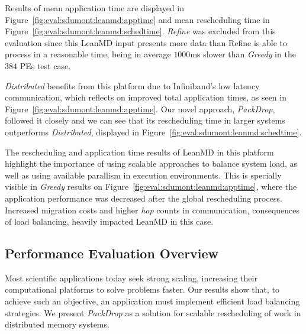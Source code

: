 

Results of mean application time are displayed in Figure~\ref{fig:eval:sdumont:leanmd:apptime} and mean rescheduling time in Figure~\ref{fig:eval:sdumont:leanmd:schedtime}.
\textit{Refine} was excluded from this evaluation since this LeanMD input presents more data than Refine is able to process in a reasonable time, being in average $1000$ms slower than \textit{Greedy} in the $384$ PEs test case. %

\textit{Distributed} benefits from this platform due to Infiniband's low latency communication, which reflects on improved total application times, as seen in Figure~\ref{fig:eval:sdumont:leanmd:apptime}.
Our novel approach, \textit{PackDrop}, followed it closely and we can see that its rescheduling time in larger systems outperforms \textit{Distributed}, displayed in Figure~\ref{fig:eval:sdumont:leanmd:schedtime}.

The rescheduling and application time results of LeanMD in this platform highlight the importance of using scalable approaches to balance system load, as well as using available parallism in execution environments.
This is specially visible in \textit{Greedy} results on Figure~\ref{fig:eval:sdumont:leanmd:apptime}, where the application performance was decreased after the global rescheduling process.
Increased migration costs and higher \textit{hop} counts in communication, consequences of load balancing, heavily impacted LeanMD in this case.

\subsection{Performance Evaluation Overview} \label{eval:overview}

Most scientific applications today seek strong scaling, increasing their computational platforms to solve problems faster.
Our results show that, to achieve such an objective, an application must implement efficient load balancing strategies.
We present \textit{PackDrop} as a solution for scalable rescheduling of work in distributed memory systems.

